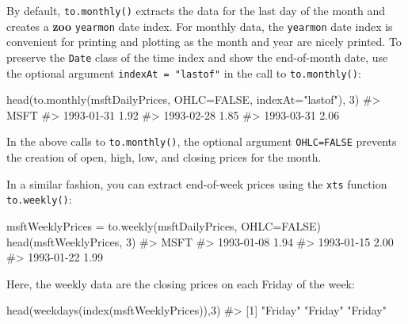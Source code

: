 \documentclass[
  letterpaper,
  DIV=11,
  numbers=noendperiod]{scrreprt}
\newenvironment{Shaded}{\begin{snugshade}}{\end{snugshade}}
\newcommand{\AttributeTok}[1]{\textcolor[rgb]{0.40,0.45,0.13}{#1}}
\newcommand{\CommentTok}[1]{\textcolor[rgb]{0.37,0.37,0.37}{#1}}
\newcommand{\ConstantTok}[1]{\textcolor[rgb]{0.56,0.35,0.01}{#1}}
\newcommand{\DecValTok}[1]{\textcolor[rgb]{0.68,0.00,0.00}{#1}}
\newcommand{\FunctionTok}[1]{\textcolor[rgb]{0.28,0.35,0.67}{#1}}
\newcommand{\NormalTok}[1]{\textcolor[rgb]{0.00,0.23,0.31}{#1}}
\newcommand{\OtherTok}[1]{\textcolor[rgb]{0.00,0.23,0.31}{#1}}
\newcommand{\StringTok}[1]{\textcolor[rgb]{0.13,0.47,0.30}{#1}}
\theoremstyle{definition}
\theoremstyle{definition}
\theoremstyle{remark}
\begin{document}
By default, \texttt{to.monthly()} extracts the data for the last day of
the month and creates a \textbf{zoo} \texttt{yearmon} date index. For
monthly data, the \texttt{yearmon} date index is convenient for printing
and plotting as the month and year are nicely printed. To preserve the
\texttt{Date} class of the time index and show the end-of-month date,
use the optional argument \texttt{indexAt\ =\ "lastof"} in the call to
\texttt{to.monthly()}:

\begin{Shaded}
\begin{Highlighting}[]
\FunctionTok{head}\NormalTok{(}\FunctionTok{to.monthly}\NormalTok{(msftDailyPrices, }\AttributeTok{OHLC=}\ConstantTok{FALSE}\NormalTok{, }\AttributeTok{indexAt=}\StringTok{"lastof"}\NormalTok{), }\DecValTok{3}\NormalTok{) }
\CommentTok{\#\textgreater{}            MSFT}
\CommentTok{\#\textgreater{} 1993{-}01{-}31 1.92}
\CommentTok{\#\textgreater{} 1993{-}02{-}28 1.85}
\CommentTok{\#\textgreater{} 1993{-}03{-}31 2.06}
\end{Highlighting}
\end{Shaded}

In the above calls to \texttt{to.monthly()}, the optional argument
\texttt{OHLC=FALSE} prevents the creation of open, high, low, and
closing prices for the month.

In a similar fashion, you can extract end-of-week prices using the
\texttt{xts} function \texttt{to.weekly()}:

\begin{Shaded}
\begin{Highlighting}[]
\NormalTok{msftWeeklyPrices }\OtherTok{=} \FunctionTok{to.weekly}\NormalTok{(msftDailyPrices, }\AttributeTok{OHLC=}\ConstantTok{FALSE}\NormalTok{)}
\FunctionTok{head}\NormalTok{(msftWeeklyPrices, }\DecValTok{3}\NormalTok{)}
\CommentTok{\#\textgreater{}            MSFT}
\CommentTok{\#\textgreater{} 1993{-}01{-}08 1.94}
\CommentTok{\#\textgreater{} 1993{-}01{-}15 2.00}
\CommentTok{\#\textgreater{} 1993{-}01{-}22 1.99}
\end{Highlighting}
\end{Shaded}

Here, the weekly data are the closing prices on each Friday of the week:

\begin{Shaded}
\begin{Highlighting}[]
\FunctionTok{head}\NormalTok{(}\FunctionTok{weekdays}\NormalTok{(}\FunctionTok{index}\NormalTok{(msftWeeklyPrices)),}\DecValTok{3}\NormalTok{)}
\CommentTok{\#\textgreater{} [1] "Friday" "Friday" "Friday"}
\end{Highlighting}
\end{Shaded}
\end{document}
